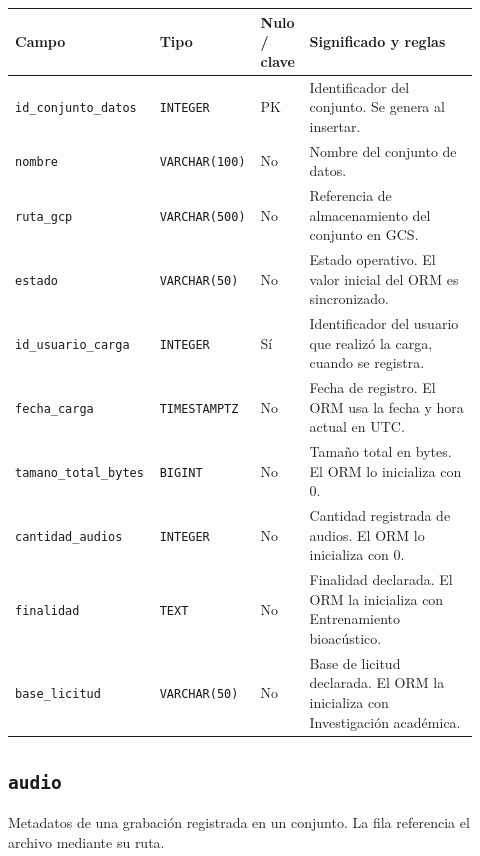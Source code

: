\noindent
\begin{tabular}{@{}p{0.30\linewidth}p{0.16\linewidth}p{0.10\linewidth}p{0.36\linewidth}@{}}
\hline
\textbf{Campo} & \textbf{Tipo} & \textbf{Nulo / clave} & \textbf{Significado y reglas} \\
\hline
\texttt{id\_\allowbreak{}conjunto\_\allowbreak{}datos} & \texttt{INTEGER} & PK & Identificador del conjunto. Se genera al insertar. \\
\texttt{nombre} & \texttt{VARCHAR(100)} & No & Nombre del conjunto de datos. \\
\texttt{ruta\_\allowbreak{}gcp} & \texttt{VARCHAR(500)} & No & Referencia de almacenamiento del conjunto en GCS. \\
\texttt{estado} & \texttt{VARCHAR(50)} & No & Estado operativo. El valor inicial del ORM es sincronizado. \\
\texttt{id\_\allowbreak{}usuario\_\allowbreak{}carga} & \texttt{INTEGER} & Sí & Identificador del usuario que realizó la carga, cuando se registra. \\
\texttt{fecha\_\allowbreak{}carga} & \texttt{TIMESTAMPTZ} & No & Fecha de registro. El ORM usa la fecha y hora actual en UTC. \\
\texttt{tamano\_\allowbreak{}total\_\allowbreak{}bytes} & \texttt{BIGINT} & No & Tamaño total en bytes. El ORM lo inicializa con 0. \\
\texttt{cantidad\_\allowbreak{}audios} & \texttt{INTEGER} & No & Cantidad registrada de audios. El ORM lo inicializa con 0. \\
\texttt{finalidad} & \texttt{TEXT} & No & Finalidad declarada. El ORM la inicializa con \guillemotleft{}Entrenamiento bioacústico\guillemotright{}. \\
\texttt{base\_\allowbreak{}licitud} & \texttt{VARCHAR(50)} & No & Base de licitud declarada. El ORM la inicializa con \guillemotleft{}Investigación académica\guillemotright{}. \\
\hline
\end{tabular}

\subsection*{\texttt{audio}}

Metadatos de una grabación registrada en un conjunto. La fila referencia el archivo mediante su ruta.

